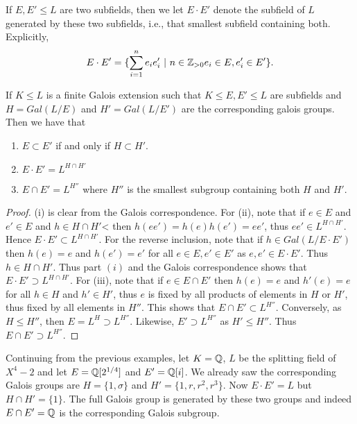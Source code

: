 \documentclass[twoside, a4paper, 10pt]{amsart}
\begin{document}
If $E,E' \leq L$ are two subfields, then we let $E \cdot E'$ denote the subfield of $L$ generated by these two subfields, i.e., that smallest subfield containing both. Explicitly, $$E \cdot E' = \{ \sum_{i=1}^n e_i e_i' ~|~ n \in \mathbb{Z}_{>0} e_i \in E, e_i' \in E' \}.$$

\begin{corol} If $K \leq L$ is a finite Galois extension such that $K\leq E, E' \leq L$ are subfields and $H = Gal(L/E)$ and $H' = Gal(L/E')$ are the corresponding galois groups. Then we have that 
\begin{enumerate}
	\item $E \subset E'$ if and only if $H \subset H'$.
	\item $E \cdot E' = L^{H \cap H'}$
	\item $E \cap E' = L^{H''}$ where $H''$ is the smallest subgroup containing both $H$ and $H'$.  
\end{enumerate}
\end{corol}

\begin{proof} (i) is clear from the Galois correspondence. For (ii), note that if $e \in E$ and $e' \in E$ and $h \in H \cap H'$< then $h(ee') = h(e)h(e') = ee'$, thus $ee' \in L^{H \cap H'}$. Hence $E \cdot E' \subset L^{H \cap H'}$. For the reverse inclusion, note that if $h \in Gal(L / E \cdot E')$ then $h(e) = e$ and $h(e') = e'$ for all $e \in E, e' \in E'$ as $e,e' \in E \cdot E'$. Thus $h \in H \cap H'$. Thus part $(i)$ and the Galois correspondence shows that $E \cdot E' \supset L^{H \cap H'}$. For (iii), note that if $e \in E \cap E'$ then $h(e) = e$ and $h'(e) = e$ for all $h \in H$ and $h' \in H'$, thus $e$ is fixed by all products of elements in $H$ or $H'$, thus fixed by all elements in $H''$. This shows that $E \cap E' \subset L^{H''}$. Conversely, as $H \leq H''$, then $E = L^H \supset L^{H''}$. Likewise, $E' \supset L^{H''}$ as $H' \leq H''$. Thus $E \cap E' \supset L^{H''}$. \end{proof}

\begin{eg} Continuing from the previous examples, let $K = \mathbb{Q}$, $L$ be the splitting field of $X^4-2$ and let $E = \mathbb{Q}[2^{1/4}]$ and $E' = \mathbb{Q}[i]$. We already saw the corresponding Galois groups are $H = \{1, \sigma\}$ and $H' = \{1,r,r^2,r^3\}$. Now $E \cdot E' = L$ but $H \cap H' = \{1\}$. The full Galois group is generated by these two groups and indeed $E \cap E' = \mathbb{Q}$ is the corresponding Galois subgroup.\end{eg}
\end{document}
